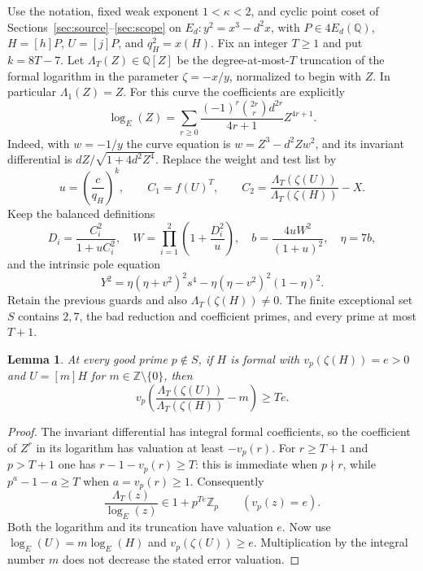 \documentclass[11pt,a4paper]{article}
\newtheorem{lemma}[theorem]{Lemma}
\newcommand{\Q}{\mathbb Q}\newcommand{\Z}{\mathbb Z}
\begin{document}
Use the notation, fixed weak exponent $1<\kappa<2$, and cyclic
point coset of Sections~\ref{sec:source}--\ref{sec:scope} on
$E_d:y^2=x^3-d^2x$, with $P\in4E_d(\Q)$,
$H=[h]P$, $U=[j]P$, and $q_H^2=x(H)$.
Fix an integer $T\ge1$ and put $k=8T-7$.
Let $\Lambda_T(Z)\in\Q[Z]$ be the degree-at-most-$T$ truncation
of the formal logarithm in the parameter $\zeta=-x/y$, normalized
to begin with $Z$. In particular $\Lambda_1(Z)=Z$.
For this curve the coefficients are explicitly
\[
 \log_E(Z)=\sum_{r\ge0}
      \frac{(-1)^r\binom{2r}{r}d^{2r}}{4r+1}Z^{4r+1}.
\]
Indeed, with $w=-1/y$ the curve equation is
$w=Z^3-d^2Zw^2$, and its invariant differential is
$dZ/\sqrt{1+4d^2Z^4}$.
Replace the weight and test list by
\[
 u=\left(\frac c{q_H}\right)^k,\qquad
 C_1=f(U)^T,\qquad
 C_2=\frac{\Lambda_T(\zeta(U))}{\Lambda_T(\zeta(H))}-X.
\]
Keep the balanced definitions
\[
 D_i=\frac{C_i^2}{1+uC_i^2},\quad
 W=\prod_{i=1}^2\left(1+\frac{D_i^2}{u}\right),\quad
 b=\frac{4uW^2}{(1+u)^2},\quad\eta=7b,
\]
and the intrinsic pole equation
\[
 Y^2=\eta(\eta+v^2)^2s^4
              -\eta(\eta-v^2)^2(1-\eta)^2.
\]
Retain the previous guards and also
$\Lambda_T(\zeta(H))\ne0$. The finite exceptional set $S$
contains $2,7$, the bad reduction and coefficient primes, and
every prime at most $T+1$.

\begin{lemma}\label{lem:truncation}
At every good prime $p\notin S$, if $H$ is formal with
$v_p(\zeta(H))=e>0$ and $U=[m]H$ for $m\in\Z\setminus\{0\}$,
then
\[
 v_p\left(
 \frac{\Lambda_T(\zeta(U))}{\Lambda_T(\zeta(H))}-m
 \right)\ge Te.
\]
\end{lemma}
\begin{proof}
The invariant differential has integral formal coefficients, so
the coefficient of $Z^r$ in its logarithm has valuation at least
$-v_p(r)$. For $r\ge T+1$ and $p>T+1$ one has
$r-1-v_p(r)\ge T$: this is immediate when $p\nmid r$, while
$p^a-1-a\ge T$ when $a=v_p(r)\ge1$.
Consequently
\[
 \frac{\Lambda_T(z)}{\log_E(z)}\in1+p^{Te}\Z_p
                         \qquad(v_p(z)=e).
\]
Both the logarithm and its truncation have valuation $e$.
Now use $\log_E(U)=m\log_E(H)$ and
$v_p(\zeta(U))\ge e$. Multiplication by the integral number
$m$ does not decrease the stated error valuation.
\end{proof}
\end{document}

